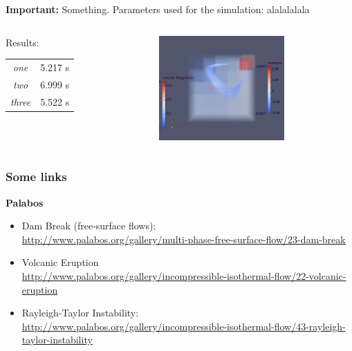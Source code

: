\documentclass{beamer}
\begin{document}
\begin{frame}
\begin{alertblock}{{\bf Important: } Something.} 
Parameters used for the simulation: alalalalala
\end{alertblock}
\vspace{0.7cm}
\begin{columns}
\begin{column}{0.47\textwidth}
Results:
\vspace{0.4cm}
\begin{tabular}{|c||c|}\hline
\it one & 5.217 s \\
\it two & 6.999 s \\
\it three & 5.522 s \\
\hline
\end{tabular}

\end{column}
\begin{column}{0.5\textwidth}
\flushright
\includegraphics[height=4cm]{simpleCavity.png}
\end{column}
\end{columns}
\end{frame}


\begin{frame}
\frametitle{Some links}  %
{\Large \bf Palabos}\\
\begin{itemize}
\item Dam Break (free-surface flows): \\
\url{http://www.palabos.org/gallery/multi-phase-free-surface-flow/23-dam-break}
\item Volcanic Eruption \\
\url{http://www.palabos.org/gallery/incompressible-isothermal-flow/22-volcanic-eruption}
\item Rayleigh-Taylor Instability: \\
\url{http://www.palabos.org/gallery/incompressible-isothermal-flow/43-rayleigh-taylor-instability}
\end{itemize}
\end{frame}
\end{document}
